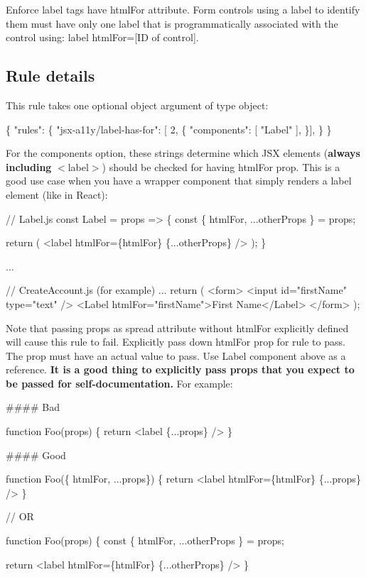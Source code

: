 Enforce label tags have html\+For attribute. Form controls using a label to identify them must have only one label that is programmatically associated with the control using\+: label html\+For=\mbox{[}ID of control\mbox{]}.

\subsection*{Rule details}

This rule takes one optional object argument of type object\+:


\begin{DoxyCode}
\{
    "rules": \{
        "jsx-a11y/label-has-for": [ 2, \{
            "components": [ "Label" ],
          \}],
    \}
\}
\end{DoxyCode}


For the {\ttfamily components} option, these strings determine which J\+SX elements ({\bfseries always including} {\ttfamily $<$label$>$}) should be checked for having {\ttfamily html\+For} prop. This is a good use case when you have a wrapper component that simply renders a {\ttfamily label} element (like in React)\+:


\begin{DoxyCode}
// Label.js
const Label = props => \{
  const \{
    htmlFor,
    ...otherProps
  \} = props;

  return (
    <label htmlFor=\{htmlFor\} \{...otherProps\} />
  );
\}

...

// CreateAccount.js (for example)
...
return (
  <form>
    <input id="firstName" type="text" />
    <Label htmlFor="firstName">First Name</Label>
  </form>
);
\end{DoxyCode}


Note that passing props as spread attribute without {\ttfamily html\+For} explicitly defined will cause this rule to fail. Explicitly pass down {\ttfamily html\+For} prop for rule to pass. The prop must have an actual value to pass. Use {\ttfamily Label} component above as a reference. {\bfseries It is a good thing to explicitly pass props that you expect to be passed for self-\/documentation.} For example\+:

\#\#\#\# Bad 
\begin{DoxyCode}
function Foo(props) \{
  return <label \{...props\} />
\}
\end{DoxyCode}


\#\#\#\# Good 
\begin{DoxyCode}
function Foo(\{ htmlFor, ...props\}) \{
    return <label htmlFor=\{htmlFor\} \{...props\} />
\}

// OR

function Foo(props) \{
    const \{
        htmlFor,
        ...otherProps
    \} = props;

   return <label htmlFor=\{htmlFor\} \{...otherProps\} />
\}
\end{DoxyCode}


